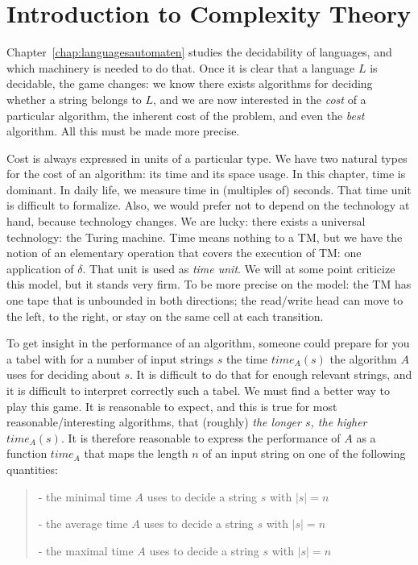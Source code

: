 
\chapter{Introduction to Complexity Theory}


Chapter~\ref{chap:languagesautomaten} studies the decidability of
languages, and which machinery is needed to do that. Once it is clear
that a language $L$ is decidable, the game changes: we know there
exists algorithms for deciding whether a string belongs to $L$, and we
are now interested in the {\em cost} of a particular algorithm, the
inherent cost of the problem, and even the {\em best} algorithm. All
this must be made more precise.

Cost is always expressed in units of a particular type. We have two
natural types for the cost of an algorithm: its time and its space
usage. In this chapter, time is dominant. In daily life, we measure
time in (multiples of) seconds. That time unit is difficult to
formalize. Also, we would prefer not to depend on the technology at
hand, because technology changes. We are lucky: there exists a
universal technology: the Turing machine. Time means nothing to a TM,
but we have the notion of an elementary operation that covers the
execution of TM: one application of $\delta$. That unit is used as
{\em time unit}. We will at some point criticize this model, but it
stands very firm. To be more precise on the model: the TM has one
tape that is unbounded in both directions; the read/write head can
move to the left, to the right, or stay on the same cell at each
transition.

To get insight in the performance of an algorithm, someone could
prepare for you a tabel with for a number of input strings $s$ the
time $time_A(s)$ the algorithm $A$ uses for deciding about $s$.
It is difficult to do that for enough relevant strings, and it is
difficult to interpret correctly such a tabel. We must find a better
way to play this game. It is reasonable to expect, and this is true
for most reasonable/interesting algorithms, that (roughly) {\em the
longer $s$, the higher $time_A(s)$}. It is therefore reasonable to
express the performance of $A$ as a function $time_A$ that maps the
length $n$ of an input string on one of the following quantities:

\begin{verse}
- the minimal time $A$ uses to decide a  string $s$ with $|s| = n$

- the average time $A$ uses to decide a  string $s$ with $|s| = n$

- the maximal time $A$ uses to decide a  string $s$ with $|s| = n$
\end{verse}

